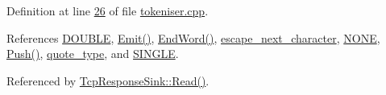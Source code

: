 Definition at line \hyperlink{tokeniser_8cpp_source_l00026}{26} of file \hyperlink{tokeniser_8cpp_source}{tokeniser.\+cpp}.



References \hyperlink{classTokeniser_a71d622e60fae9d6c36c96ba69a4f62e4afd3e4ece78a7d422280d5ed379482229}{D\+O\+U\+B\+L\+E}, \hyperlink{tokeniser_8cpp_source_l00113}{Emit()}, \hyperlink{tokeniser_8cpp_source_l00103}{End\+Word()}, \hyperlink{tokeniser_8hpp_source_l00060}{escape\+\_\+next\+\_\+character}, \hyperlink{classTokeniser_a71d622e60fae9d6c36c96ba69a4f62e4ab50339a10e1de285ac99d4c3990b8693}{N\+O\+N\+E}, \hyperlink{tokeniser_8cpp_source_l00094}{Push()}, \hyperlink{tokeniser_8hpp_source_l00063}{quote\+\_\+type}, and \hyperlink{classTokeniser_a71d622e60fae9d6c36c96ba69a4f62e4a0679273e201afd0bf57af3961f8a23b8}{S\+I\+N\+G\+L\+E}.



Referenced by \hyperlink{io__reactor_8cpp_source_l00213}{Tcp\+Response\+Sink\+::\+Read()}.


